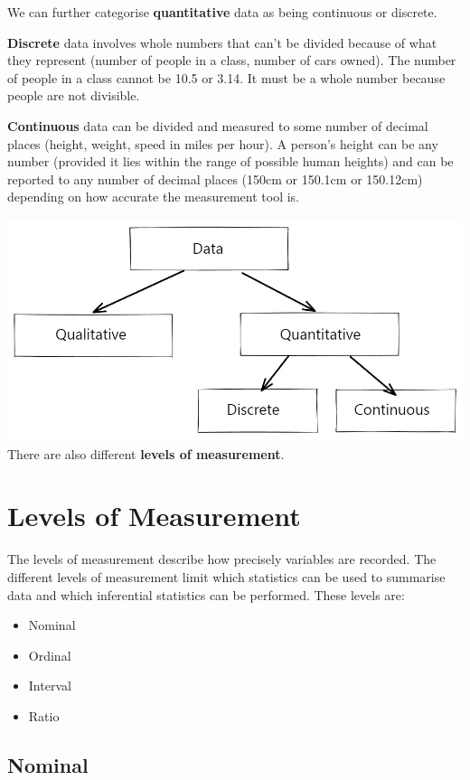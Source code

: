 \documentclass[
]{book}
\providecommand{\tightlist}{%
  \setlength{\itemsep}{0pt}\setlength{\parskip}{0pt}}
\begin{document}
We can further categorise \textbf{quantitative} data as being continuous or discrete.

\textbf{Discrete} data involves whole numbers that can't be divided because of what they represent (number of people in a class, number of cars owned). The number of people in a class cannot be 10.5 or 3.14. It must be a whole number because people are not divisible.

\textbf{Continuous} data can be divided and measured to some number of decimal places (height, weight, speed in miles per hour). A person's height can be any number (provided it lies within the range of possible human heights) and can be reported to any number of decimal places (150cm or 150.1cm or 150.12cm) depending on how accurate the measurement tool is.

\includegraphics{data.jpg}
There are also different \textbf{levels of measurement}.

\hypertarget{levels-of-measurement}{%
\section{Levels of Measurement}\label{levels-of-measurement}}

The levels of measurement describe how precisely variables are recorded. The different levels of measurement limit which statistics can be used to summarise data and which inferential statistics can be performed. These levels are:

\begin{itemize}
\tightlist
\item
  Nominal
\item
  Ordinal
\item
  Interval
\item
  Ratio
\end{itemize}

\hypertarget{nominal}{%
\subsection{Nominal}\label{nominal}}
\end{document}
